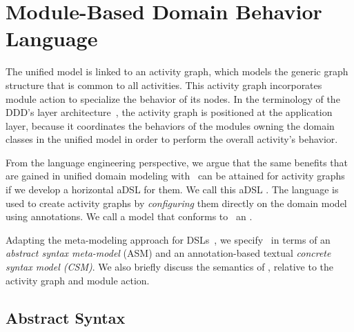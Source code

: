 %
\section{Module-Based Domain Behavior Language}\label{sect:agl} %
The unified model is linked to an activity graph, which models the generic graph structure that is common to all activities. This activity graph incorporates module action to specialize the behavior of its nodes.
In the terminology of the DDD's layer architecture~\cite{evans_domain-driven_2004}, the activity graph is positioned at the application layer, because it coordinates the behaviors of the modules owning the domain classes in the unified model in order to perform the overall activity's behavior.

From the language engineering perspective, we argue that the same benefits that are gained in unified domain modeling with \dcsl~can be attained for activity graphs if we develop a horizontal aDSL for them. We call this aDSL .
The language is used to create activity graphs by \textit{configuring} them directly on the domain model using annotations. We call a model that conforms to \agl~an .

Adapting the meta-modeling approach for DSLs~\cite{kleppe_software_2008}, we specify \agl~in terms of an \textit{abstract syntax meta-model} (ASM) and an annotation-based textual \textit{concrete syntax model (CSM)}. We also briefly discuss the semantics of \agl, relative to the activity graph and module action.
%
\subsection{Abstract Syntax} \label{sect:agl-abstractSyntax}

